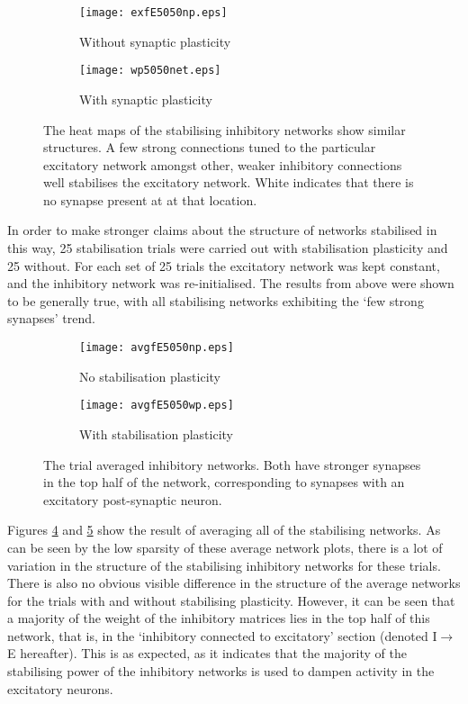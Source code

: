 \documentclass[12pt, a4paper]{article}
\begin{document}
\begin{figure}[Thb]
    \begin{subfigure}{0.5\linewidth}
        \centering
        \texttt{[image: exfE5050np.eps]}
        \label{fig:5050np}
        \caption{Without synaptic plasticity}
    \end{subfigure}
    \begin{subfigure}{0.5\linewidth}
        \centering
        \texttt{[image: wp5050net.eps]}
        \label{fig:5050wp}
        \caption{With synaptic plasticity}    
    \end{subfigure}    
    \caption{The heat maps of the stabilising inhibitory networks show similar structures.  A few strong connections tuned to the particular excitatory network amongst other, weaker inhibitory connections well stabilises the excitatory network. White indicates that there is no synapse present at at that location.}        
    \label{fig:5050net}
\end{figure}

In order to make stronger claims about the structure of networks stabilised in this way, 25 stabilisation trials were carried out with stabilisation plasticity and 25 without.   For each set of 25 trials the excitatory network was kept constant, and the inhibitory network was re-initialised.  The results from above were shown to be generally true, with all stabilising networks exhibiting the `few strong synapses' trend. 


\begin{figure}[Thb]
    \begin{subfigure}{0.5\linewidth}
        \texttt{[image: avgfE5050np.eps]}
        \caption{No stabilisation plasticity}
        \label{fig:avg5050np}
    \end{subfigure}
    \hspace{\fill}
    \begin{subfigure}{0.5\linewidth}
        \texttt{[image: avgfE5050wp.eps]}
        \caption{With stabilisation plasticity}
        \label{fig:avg5050wp}
    \end{subfigure}
    \caption{The trial averaged inhibitory networks.  Both have stronger synapses in the top half of the network, corresponding to synapses with an excitatory post-synaptic neuron.}
    \label{fig:avg5050}
\end{figure}


Figures \ref{fig:avg5050np} and \ref{fig:avg5050wp} show the result of averaging all of the stabilising networks.  As can be seen by the low sparsity of these average network plots, there is a lot of variation in the structure of the stabilising inhibitory networks for these trials.  There is also no obvious visible difference in the structure of the average networks for the trials with and without stabilising plasticity.  However, it can be seen that a majority of the weight of the inhibitory matrices lies in the top half of this network, that is, in the `inhibitory connected to excitatory' section (denoted I$\rightarrow$E hereafter).  This is as expected, as it indicates that the majority of the stabilising power of the inhibitory networks is used to dampen activity in the excitatory neurons.
\end{document}
